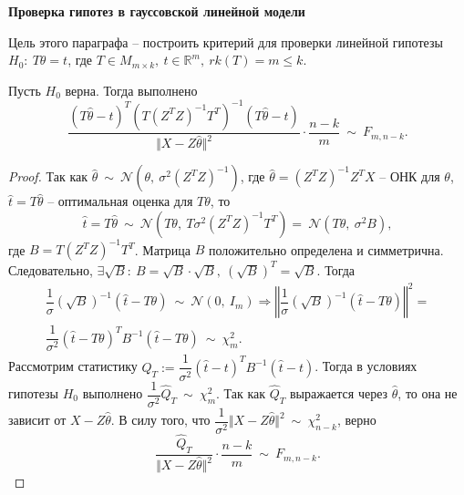 \textbf{Проверка гипотез в гауссовской линейной модели}

Цель этого параграфа -- построить критерий для проверки линейной гипотезы $\displaystyle H_{0} :\ T\theta =t$, где $\displaystyle T\in M_{m\times k} ,\ t\in \mathbb{R}^{m} ,\ rk( T) =m\leqslant k$.
\begin{proposition}
    Пусть $\displaystyle H_{0}$ верна. Тогда выполнено
    \begin{equation*}
        \dfrac{( T\hat{\theta } -t)^{T}\left( T\left( Z^{T} Z\right)^{-1} T^{T}\right)^{-1}( T\hat{\theta } -t)}{\Vert X-Z\hat{\theta }\Vert ^{2}} \cdotp \dfrac{n-k}{m} \ \sim \ F_{m,n-k} .
    \end{equation*}
\end{proposition}
\begin{proof}
    Так как $\displaystyle \hat{\theta } \ \sim \ \mathcal{N}\left( \theta ,\ \sigma ^{2}\left( Z^{T} Z\right)^{-1}\right)$, где $\displaystyle \hat{\theta } =\left( Z^{T} Z\right)^{-1} Z^{T} X$ -- ОНК для $\displaystyle \theta $, $\displaystyle \hat{t} =T\hat{\theta }$ -- оптимальная оценка для $\displaystyle T\theta $, то 
    \begin{equation*}
        \hat{t} =T\hat{\theta } \ \sim \ \mathcal{N}\left( T\theta ,\ T\sigma ^{2}\left( Z^{T} Z\right)^{-1} T^{T}\right) =\ \mathcal{N}\left( T\theta ,\ \sigma ^{2} B\right) ,
    \end{equation*}
    где $\displaystyle B=T\left( Z^{T} Z\right)^{-1} T^{T}$. Матрица $\displaystyle B$ положительно определена и симметрична. Следовательно, $\displaystyle \exists \sqrt{B} :\ B=\sqrt{B} \cdotp \sqrt{B} ,\ \left(\sqrt{B}\right)^{T} =\sqrt{B}$. Тогда
    \begin{gather*}
        \dfrac{1}{\sigma }\left(\sqrt{B}\right)^{-1}(\hat{t} -T\theta ) \ \sim \ \mathcal{N}( 0,\ I_{m}) \Rightarrow \left\Vert \dfrac{1}{\sigma }\left(\sqrt{B}\right)^{-1}(\hat{t} -T\theta )\right\Vert ^{2} =\\
        \dfrac{1}{\sigma ^{2}}(\hat{t} -T\theta )^{T} B^{-1}(\hat{t} -T\theta ) \ \sim \ \chi _{m}^{2} .
    \end{gather*}
    Рассмотрим статистику $\displaystyle \hat{Q}_{T} :=\dfrac{1}{\sigma ^{2}}(\hat{t} -t)^{T} B^{-1}(\hat{t} -t)$. Тогда в условиях гипотезы $\displaystyle H_{0}$ выполнено $\displaystyle \dfrac{1}{\sigma ^{2}}\hat{Q}_{T} \ \sim \ \chi _{m}^{2}$. Так как $\displaystyle \hat{Q}_{T}$ выражается через $\displaystyle \hat{\theta }$, то она не зависит от $\displaystyle X-Z\hat{\theta }$. В силу того, что $\displaystyle \dfrac{1}{\sigma ^{2}}\Vert X-Z\hat{\theta }\Vert ^{2} \ \sim \ \chi _{n-k}^{2}$, верно
    \begin{equation*}
        \dfrac{\hat{Q}_{T}}{\Vert X-Z\hat{\theta }\Vert ^{2}} \cdotp \dfrac{n-k}{m} \ \sim \ F_{m,n-k} .
    \end{equation*}
\end{proof}

